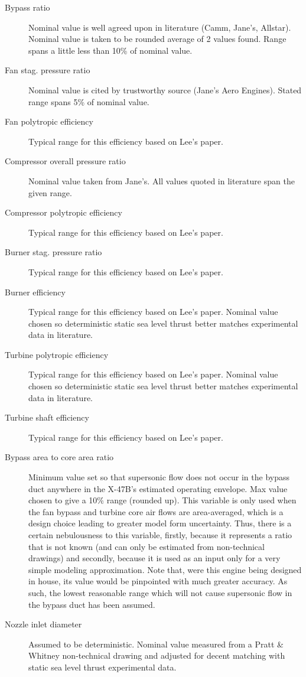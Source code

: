\documentclass{article}
\begin{document}
\begin{description}
\item[Bypass ratio] Nominal value is well agreed upon in literature (Camm, Jane's, Allstar). Nominal value is taken to be rounded average of 2 values found. Range spans a little less than 10\% of nominal value.
\item[Fan stag. pressure ratio] Nominal value is cited by trustworthy source (Jane's Aero Engines). Stated range spans 5\% of nominal value.
\item[Fan polytropic efficiency] Typical range for this efficiency based on Lee's paper.
\item[Compressor overall pressure ratio] Nominal value taken from Jane's. All values quoted in literature span the given range.
\item[Compressor polytropic efficiency] Typical range for this efficiency based on Lee's paper.
\item[Burner stag. pressure ratio] Typical range for this efficiency based on Lee's paper.
\item[Burner efficiency] Typical range for this efficiency based on Lee's paper. Nominal value chosen so deterministic static sea level thrust better matches experimental data in literature.
\item[Turbine polytropic efficiency] Typical range for this efficiency based on Lee's paper. Nominal value chosen so deterministic static sea level thrust better matches experimental data in literature.
\item[Turbine shaft efficiency] Typical range for this efficiency based on Lee's paper.
\item[Bypass area to core area ratio] Minimum value set so that supersonic flow does not occur in the bypass duct anywhere in the X-47B's estimated operating envelope. Max value chosen to give a 10\% range (rounded up). This variable is only used when the fan bypass and turbine core air flows are area-averaged, which is a design choice leading to greater model form uncertainty. Thus, there is a certain nebulousness to this variable, firstly, because it represents a ratio that is not known (and can only be estimated from non-technical drawings) and secondly, because it is used as an input only for a very simple modeling approximation. Note that, were this engine being designed in house, its value would be pinpointed with much greater accuracy. As such, the lowest reasonable range which will not cause supersonic flow in the bypass duct has been assumed.
\item[Nozzle inlet diameter] Assumed to be deterministic. Nominal value measured from a Pratt \& Whitney non-technical drawing and adjusted for decent matching with static sea level thrust experimental data.

\end{description}
\end{document}
